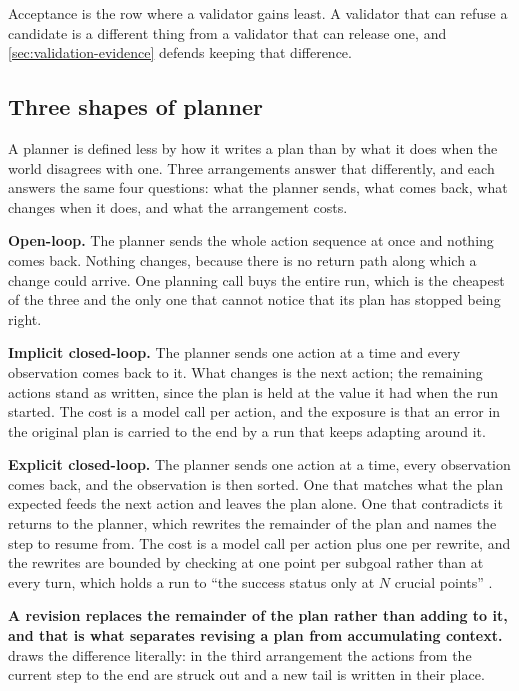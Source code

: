 Acceptance is the row where a validator gains least. A validator that can refuse a candidate is a
different thing from a validator that can release one, and \cref{sec:validation-evidence} defends
keeping that difference.

\subsection{Three shapes of planner}
\label{sec:planning-shapes}

A planner is defined less by how it writes a plan than by what it does when the world disagrees with
one. Three arrangements answer that differently, and each answers the same four questions: what the
planner sends, what comes back, what changes when it does, and what the arrangement costs.

\bi

\item \textbf{Open-loop.} The planner sends the whole action sequence at once and nothing comes
back. Nothing changes, because there is no return path along which a change could arrive. One
planning call buys the entire run, which is the cheapest of the three and the only one that cannot
notice that its plan has stopped being right.

\item \textbf{Implicit closed-loop.} The planner sends one action at a time and every observation
comes back to it. What changes is the next action; the remaining actions stand as written, since the
plan is held at the value it had when the run started. The cost is a model call per action, and the
exposure is that an error in the original plan is carried to the end by a run that keeps adapting
around it.

\item \textbf{Explicit closed-loop.} The planner sends one action at a time, every observation comes
back, and the observation is then sorted. One that matches what the plan expected feeds the next
action and leaves the plan alone. One that contradicts it returns to the planner, which rewrites the
remainder of the plan and names the step to resume from. The cost is a model call per action plus
one per rewrite, and the rewrites are bounded by checking at one point per subgoal rather than at
every turn, which holds a run to
``the success status only at $N$ crucial points'' \citep[\S3]{sun2023adaplanner}.

\ei

\textbf{A revision replaces the remainder of the plan rather than adding to it, and that is what
separates revising a plan from accumulating context.}  draws the difference
literally: in the third arrangement the actions from the current step to the end are struck out and
a new tail is written in their place.

